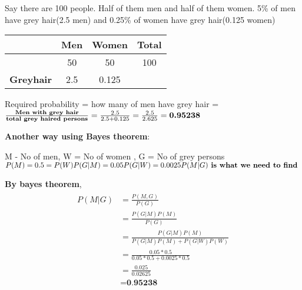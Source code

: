 Say there are 100 people. Half of them men and half of them women. 5\% of men have grey hair(2.5 men) and 0.25\% of women have grey hair(0.125 women)


\begin{center}
\begin{tabular}{ |c|c|c|c| } 
\hline
 & \textbf{Men} & \textbf{Women} & \textbf{Total} \\
\hline
 & 50 & 50 & 100 \\ 
\hline
\textbf{Greyhair} & 2.5 & 0.125 & \\ 
 \hline
\end{tabular}
\end{center}


 Required probability = how many of men have grey hair = $\frac{\textbf{Men with grey hair}}{\textbf{total grey haired persons}} \\ = \frac{2.5}{2.5+0.125} \\ = \frac{2.5}{2.625} \\ = \textbf{0.95238} $ 
 
\textbf{ Another way using Bayes theorem}:

M - No of men, W = No of women , G = No of grey persons
$P(M) = 0.5 = P(W) \\ P(G|M) =0.05 \\ P(G|W) = 0.0025 \\ P(M|G) \textbf{ is what we need to find } $

\textbf{By bayes theorem}, 
\begin{multline*}
\begin{split}
P(M|G) & = \frac{P(M,G)}{P(G)} \\
 & = \frac{P(G|M)P(M)}{P(G)} \\
 & = \frac{P(G|M)P(M)}{P(G|M)P(M)+P(G|W)P(W)} \\
 & = \frac{0.05*0.5}{0.05*0.5+0.0025*0.5} \\
 & = \frac{0.025}{0.02625} \\
 & = \textbf{0.95238}
\end{split}
\end{multline*}
        
